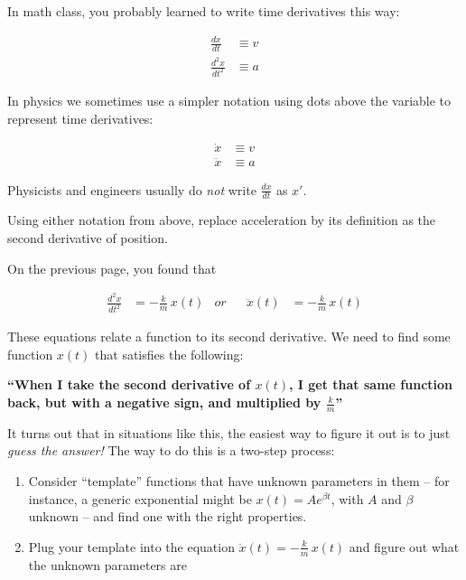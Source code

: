 \documentclass[12pt]{article}
\begin{document}
\begin{minipage}{0.46\textwidth}

In math class, you probably learned to write time derivatives this way:

\begin{align*}
\frac{dx}{dt} &\equiv v \\
\frac{d^2x}{dt^2} &\equiv a 
\end{align*}
\end{minipage}
\begin{minipage}{0.46\textwidth}
In physics we sometimes use a simpler notation using dots above the variable to represent time derivatives:

\begin{align*}
\dot x &\equiv v \\
\ddot x &\equiv a 
\end{align*}

Physicists and engineers usually do {\it not} write $\frac{dx}{dt}$ as $x'$.



\end{minipage}
\begin{center}\underline{\hspace{6in}}\end{center}

\vspace{0.3in}

Using either notation from above, replace acceleration by its definition as the second derivative of position. 

\newpage

On the previous page, you found that

\begin{align*}
\frac{d^2 x}{dt^2} &= -\frac{k}{m}\,x(t) &or&& \ddot x(t) &= -\frac{k}{m}\,x(t) 
\end{align*}

These equations relate a function to its second derivative. We need to find some function $x(t)$ that satisfies the following:

\large \bf ``When I take the second derivative of $x(t)$, I get that same function back, but with a negative sign, and multiplied by $\frac{k}{m}$'' \rm \normalsize

It turns out that in situations like this, the easiest way to figure it out is to just {\it guess the answer!} The way to do this is a two-step process:

\begin{enumerate}
	\item Consider ``template'' functions that have unknown parameters in them -- for instance, a generic exponential might be $x(t) = Ae^{\beta t}$, with $A$ and $\beta$ unknown -- and find one with the right properties.
	\item Plug your template into the equation $\ddot x(t) = -\frac{k}{m}\, x(t)$ and figure out what the unknown parameters are
\end{enumerate}
\end{document}

